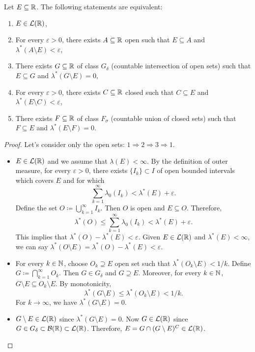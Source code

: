 \clearpage
\begin{theorem}
Let $E \subseteq \mathbb{R}$. The following statements are equivalent:
\begin{enumerate}
    \item $E \in \mathcal{L}(\mathbb{R})$,
    \item For every $\varepsilon > 0$, there exists $A \subseteq \mathbb{R}$ open such that $E \subseteq A$ and $\lambda^*(A \setminus E) < \varepsilon$,
    \item There exists $G \subseteq \mathbb{R}$ of class $G_\delta$ (countable intersection of open sets) such that $E \subseteq G$ and $\lambda^*(G \setminus E) = 0$,
    \item For every $\varepsilon > 0$, there exists $C \subseteq \mathbb{R}$ closed such that $C \subseteq E$ and $\lambda^*(E \setminus C) < \varepsilon$,
    \item There exists $F \subseteq \mathbb{R}$ of class $F_\sigma$ (countable union of closed sets) such that $F \subseteq E$ and $\lambda^*(E \setminus F) = 0$.
\end{enumerate}
\end{theorem}

\begin{proof}
Let's consider only the open sets: $1 \Rightarrow 2 \Rightarrow 3 \Rightarrow 1$.

\begin{itemize}[leftmargin=5em]
    \item[$(1) \Rightarrow (2)$] $E \in \mathcal{L}(\mathbb{R})$ and we assume that $\lambda(E) < \infty$.
    By the definition of outer measure, for every $\varepsilon > 0$, there exists $\{I_k\} \subset I$ of open bounded intervals which covers $E$ and for which
    \[
    \sum_{k=1}^{\infty} \lambda_0(I_k) < \lambda^*(E) + \varepsilon.
    \]
    Define the set $O \coloneqq \bigcup_{k=1}^{\infty} I_k$. Then $O$ is open and $E \subseteq O$. Therefore,
    \[
    \lambda^*(O) \leq \sum_{k=1}^{\infty} \lambda_0(I_k) < \lambda^*(E) + \varepsilon.
    \]
    This implies that $\lambda^*(O) - \lambda^*(E) < \varepsilon$.
    Given $E \in \mathcal{L}(\mathbb{R})$ and $\lambda^*(E) < \infty$, we can say $\lambda^*(O \setminus E) = \lambda^*(O) - \lambda^*(E) < \varepsilon$.

    \item[$(2) \Rightarrow (3)$] For every $k \in \mathbb{N}$, choose $O_k \supseteq E$ open set such that $\lambda^*(O_k \setminus E) < 1/k$.
    Define $G \coloneqq \bigcap_{k=1}^{\infty} O_k$. Then $G \in G_\delta$ and $G \supseteq E$.
    Moreover, for every $k \in \mathbb{N}$, $G \setminus E \subseteq O_k \setminus E$. By monotonicity,
    \[
    \lambda^*(G \setminus E) \leq \lambda^*(O_k \setminus E) < 1/k.
    \]
    For $k \to \infty$, we have $\lambda^*(G \setminus E) = 0$.

    \item[$(3) \Rightarrow (1)$] $G \setminus E \in \mathcal{L}(\mathbb{R})$ since $\lambda^*(G \setminus E) = 0$.
    Now $G \in \mathcal{L}(\mathbb{R})$ since $G \in G_\delta \subset \mathcal{B}(\mathbb{R}) \subset \mathcal{L}(\mathbb{R})$.
    Therefore, $E = G \cap (G \setminus E)^C \in \mathcal{L}(\mathbb{R})$.
\end{itemize}
\end{proof}

